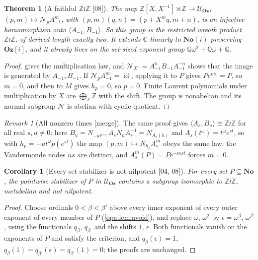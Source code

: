 \documentclass[11pt,oneside]{article}
\numberwithin{equation}{section}
\newtheorem{theorem}{Theorem}[section]
\newtheorem{corollary}[corollary]{Corollary}
\theoremstyle{definition}
\theoremstyle{remark}
\newtheorem{remark}[remark]{Remark}
\newcommand{\No}{\mathbf{No}}
\newcommand{\Oz}{\mathbf{Oz}}
\newcommand{\Og}{\mathbf{Oz}[i]}
\newcommand{\SC}{\mathbf{No}(i)}
\newcommand{\C}{\mathbb C}
\newcommand{\Q}{\mathbb Q}
\newcommand{\Z}{\mathbb Z}
\newcommand{\UU}{\mathcal U}
\newcommand{\id}{\operatorname{id}}
\newcommand{\src}[1]{\textup{\textsf{\small[#1]}}}
\newcommand{\mergetag}{\textup{\textsf{\small[merge]}}}
\begin{document}
\begin{theorem}[A faithful $\Z\wr\Z$ \src{08}]\label{opa:thm:wreath}
The map $\Z[X,X^{-1}]\rtimes\Z\to\UU_\Oz$, $(p,m)\mapsto\mathcal N_pA_{-1}^m$, with
$(p,m)(q,n)=(p+X^mq,m+n)$, is an injective homomorphism onto
$\langle A_{-1},B_{-1}\rangle$. So this group is the restricted wreath product
$\Z\wr\Z$, of derived length exactly two. It extends $\C$-linearly to $\SC$
preserving $\Og$, and it already lives on the set-sized exponent group
$\Q\omega^2+\Q\omega+\Q$.
\end{theorem}
\begin{proof}
 gives the multiplication law, and
$\mathcal N_{X^n}=A_{-1}^nB_{-1}A_{-1}^{-n}$ shows that the image is generated by
$A_{-1},B_{-1}$. If $\mathcal N_pA_{-1}^m=\id$, applying it to $P$ gives
$Pe^{mv}=P$, so $m=0$, and then to $M$ gives $h_p=0$, so $p=0$. Finite Laurent
polynomials under multiplication by $X$ are $\bigoplus_\Z\Z$ with the shift.
The group is nonabelian and its normal subgroup $\mathcal N$ is abelian with
cyclic quotient.
\end{proof}

\begin{remark}[All nonzero times \mergetag]\label{opa:rem:alltimes}
The same proof gives $\langle A_s,B_u\rangle\cong\Z\wr\Z$ for all real $s,u\ne0$:
here $B_u=N_{-ut^\omega}$, $A_sN_hA_s^{-1}=N_{A_s(h)}$ and
$A_s(t^\omega)=t^\omega e^{st}$, so with $h_p=-ut^\omega p(e^{st})$ the map
$(p,m)\mapsto N_{h_p}A_s^m$ obeys the same law; the Vandermonde nodes $ns$ are
distinct, and $A_s^m(P)=Pe^{-mst}$ forces $m=0$.
\end{remark}

\begin{corollary}[Every set stabilizer is not nilpotent \src{04, 08}]\label{opa:cor:localnonabelian}
For every set $P\subseteq\No$, the pointwise stabilizer of $P$ in $\UU_\Oz$ contains a
subgroup isomorphic to $\Z\wr\Z$, metabelian and not nilpotent.
\end{corollary}
\begin{proof}
Choose ordinals $0<\beta<\beta'$ above every inner exponent of every outer
exponent of every member of $P$ (\cref{opa:lem:avoid}), and replace $\omega$,
$\omega^2$ by $\epsilon=\omega^\beta$, $\omega^{\beta'}$, using the functionals
$q_\beta$, $q_{\beta'}$ and the shifts $1$, $\epsilon$. Both functionals vanish on
the exponents of $P$ and satisfy the criterion, and $q_\beta(\epsilon)=1$,
$q_\beta(1)=q_{\beta'}(\epsilon)=q_{\beta'}(1)=0$; the proofs are unchanged.
\end{proof}
\end{document}
